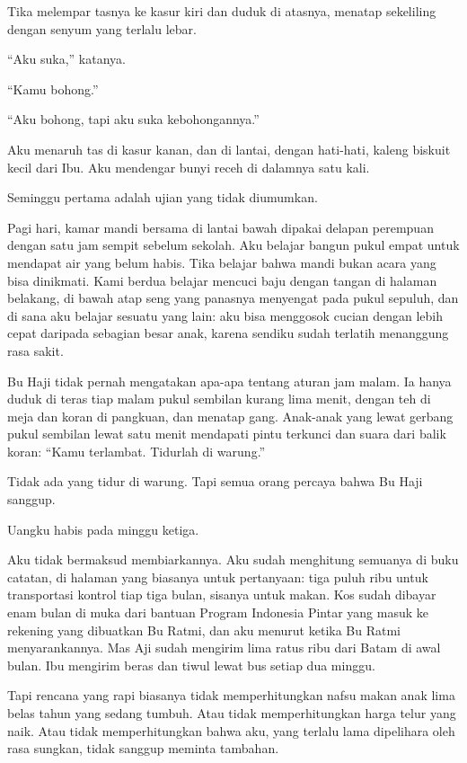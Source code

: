 \documentclass[11pt,twoside,openany]{book}
\makeatletter
\newcommand{\scenebreak}{\par\vspace{0.9em}{\centering\textsc{*\hspace{0.7em}*\hspace{0.7em}*}\par}\vspace{0.9em}\@afterindentfalse\@afterheading}
\makeatother
\begin{document}
Tika melempar tasnya ke kasur kiri dan duduk di atasnya, menatap sekeliling dengan senyum yang terlalu lebar.

``Aku suka,'' katanya.

``Kamu bohong.''

``Aku bohong, tapi aku suka kebohongannya.''

Aku menaruh tas di kasur kanan, dan di lantai, dengan hati-hati, kaleng biskuit kecil dari Ibu. Aku mendengar bunyi receh di dalamnya satu kali.

\scenebreak
Seminggu pertama adalah ujian yang tidak diumumkan.

Pagi hari, kamar mandi bersama di lantai bawah dipakai delapan perempuan dengan satu jam sempit sebelum sekolah. Aku belajar bangun pukul empat untuk mendapat air yang belum habis. Tika belajar bahwa mandi bukan acara yang bisa dinikmati. Kami berdua belajar mencuci baju dengan tangan di halaman belakang, di bawah atap seng yang panasnya menyengat pada pukul sepuluh, dan di sana aku belajar sesuatu yang lain: aku bisa menggosok cucian dengan lebih cepat daripada sebagian besar anak, karena sendiku sudah terlatih menanggung rasa sakit.

Bu Haji tidak pernah mengatakan apa-apa tentang aturan jam malam. Ia hanya duduk di teras tiap malam pukul sembilan kurang lima menit, dengan teh di meja dan koran di pangkuan, dan menatap gang. Anak-anak yang lewat gerbang pukul sembilan lewat satu menit mendapati pintu terkunci dan suara dari balik koran: ``Kamu terlambat. Tidurlah di warung.''

Tidak ada yang tidur di warung. Tapi semua orang percaya bahwa Bu Haji sanggup.

\scenebreak
Uangku habis pada minggu ketiga.

Aku tidak bermaksud membiarkannya. Aku sudah menghitung semuanya di buku catatan, di halaman yang biasanya untuk pertanyaan: tiga puluh ribu untuk transportasi kontrol tiap tiga bulan, sisanya untuk makan. Kos sudah dibayar enam bulan di muka dari bantuan Program Indonesia Pintar yang masuk ke rekening yang dibuatkan Bu Ratmi, dan aku menurut ketika Bu Ratmi menyarankannya. Mas Aji sudah mengirim lima ratus ribu dari Batam di awal bulan. Ibu mengirim beras dan tiwul lewat bus setiap dua minggu.

Tapi rencana yang rapi biasanya tidak memperhitungkan nafsu makan anak lima belas tahun yang sedang tumbuh. Atau tidak memperhitungkan harga telur yang naik. Atau tidak memperhitungkan bahwa aku, yang terlalu lama dipelihara oleh rasa sungkan, tidak sanggup meminta tambahan.
\end{document}
